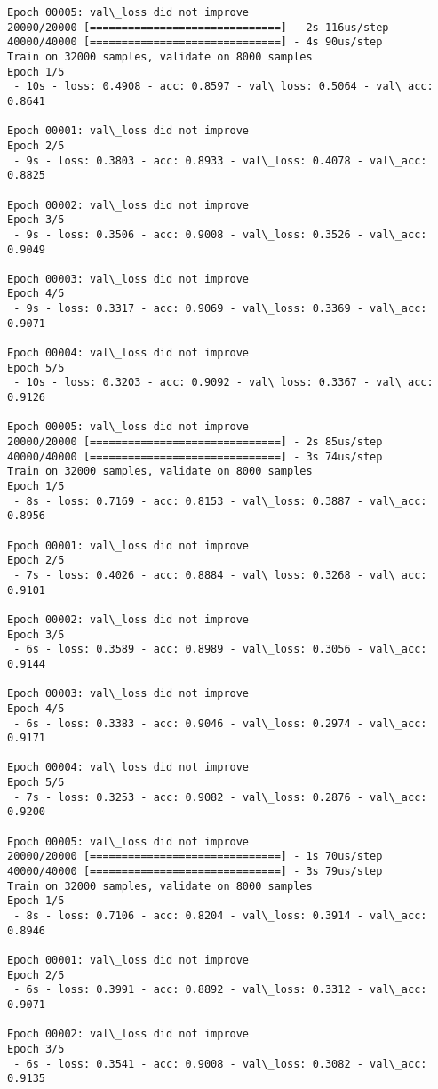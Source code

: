 \documentclass[11pt]{article}
\begin{document}
\begin{Verbatim}[commandchars=\\\{\}]
Epoch 00005: val\_loss did not improve
20000/20000 [==============================] - 2s 116us/step
40000/40000 [==============================] - 4s 90us/step
Train on 32000 samples, validate on 8000 samples
Epoch 1/5
 - 10s - loss: 0.4908 - acc: 0.8597 - val\_loss: 0.5064 - val\_acc: 0.8641

Epoch 00001: val\_loss did not improve
Epoch 2/5
 - 9s - loss: 0.3803 - acc: 0.8933 - val\_loss: 0.4078 - val\_acc: 0.8825

Epoch 00002: val\_loss did not improve
Epoch 3/5
 - 9s - loss: 0.3506 - acc: 0.9008 - val\_loss: 0.3526 - val\_acc: 0.9049

Epoch 00003: val\_loss did not improve
Epoch 4/5
 - 9s - loss: 0.3317 - acc: 0.9069 - val\_loss: 0.3369 - val\_acc: 0.9071

Epoch 00004: val\_loss did not improve
Epoch 5/5
 - 10s - loss: 0.3203 - acc: 0.9092 - val\_loss: 0.3367 - val\_acc: 0.9126

Epoch 00005: val\_loss did not improve
20000/20000 [==============================] - 2s 85us/step
40000/40000 [==============================] - 3s 74us/step
Train on 32000 samples, validate on 8000 samples
Epoch 1/5
 - 8s - loss: 0.7169 - acc: 0.8153 - val\_loss: 0.3887 - val\_acc: 0.8956

Epoch 00001: val\_loss did not improve
Epoch 2/5
 - 7s - loss: 0.4026 - acc: 0.8884 - val\_loss: 0.3268 - val\_acc: 0.9101

Epoch 00002: val\_loss did not improve
Epoch 3/5
 - 6s - loss: 0.3589 - acc: 0.8989 - val\_loss: 0.3056 - val\_acc: 0.9144

Epoch 00003: val\_loss did not improve
Epoch 4/5
 - 6s - loss: 0.3383 - acc: 0.9046 - val\_loss: 0.2974 - val\_acc: 0.9171

Epoch 00004: val\_loss did not improve
Epoch 5/5
 - 7s - loss: 0.3253 - acc: 0.9082 - val\_loss: 0.2876 - val\_acc: 0.9200

Epoch 00005: val\_loss did not improve
20000/20000 [==============================] - 1s 70us/step
40000/40000 [==============================] - 3s 79us/step
Train on 32000 samples, validate on 8000 samples
Epoch 1/5
 - 8s - loss: 0.7106 - acc: 0.8204 - val\_loss: 0.3914 - val\_acc: 0.8946

Epoch 00001: val\_loss did not improve
Epoch 2/5
 - 6s - loss: 0.3991 - acc: 0.8892 - val\_loss: 0.3312 - val\_acc: 0.9071

Epoch 00002: val\_loss did not improve
Epoch 3/5
 - 6s - loss: 0.3541 - acc: 0.9008 - val\_loss: 0.3082 - val\_acc: 0.9135


\end{Verbatim}
\end{document}
